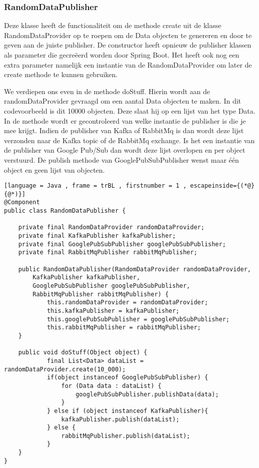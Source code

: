 \subsubsection{RandomDataPublisher}
Deze klasse heeft de functionaliteit om de methode create uit de klasse RandomDataProvider op te roepen om de Data objecten te genereren en door te geven aan de juiste publisher. De constructor heeft opnieuw de publisher klassen als parameter die gecreëerd worden door Spring Boot. Het heeft ook nog een extra parameter namelijk een instantie van de RandomDataProvider om later de create methode te kunnen gebruiken.

We verdiepen ons even in de methode doStuff. Hierin wordt aan de randomDataProvider gevraagd om een aantal Data objecten te maken. In dit codevoorbeeld is dit 10000 objecten. Deze slaat hij op een lijst van het type Data. In de methode wordt er gecontroleerd van welke instantie de publisher is die je mee krijgt. Indien de publisher van Kafka of RabbitMq is dan wordt deze lijst verzonden naar de Kafka topic of de RabbitMq exchange. Is het een instantie van de publisher van Google Pub/Sub dan wordt deze lijst overlopen en per object verstuurd. De publish methode van GooglePubSubPublisher wenst maar één object en geen lijst van objecten.

\begin{lstlisting}[language = Java , frame = trBL , firstnumber = 1 , escapeinside={(*@}{@*)}]
@Component
public class RandomDataPublisher {

    private final RandomDataProvider randomDataProvider;
    private final KafkaPublisher kafkaPublisher;
    private final GooglePubSubPublisher googlePubSubPublisher;
    private final RabbitMqPublisher rabbitMqPublisher;

    public RandomDataPublisher(RandomDataProvider randomDataProvider,
        KafkaPublisher kafkaPublisher,
        GooglePubSubPublisher googlePubSubPublisher,
        RabbitMqPublisher rabbitMqPublisher) {
            this.randomDataProvider = randomDataProvider;
            this.kafkaPublisher = kafkaPublisher;
            this.googlePubSubPublisher = googlePubSubPublisher;
            this.rabbitMqPublisher = rabbitMqPublisher;
    }

    public void doStuff(Object object) {
            final List<Data> dataList = randomDataProvider.create(10_000);
            if(object instanceof GooglePubSubPublisher) {
                for (Data data : dataList) {
                    googlePubSubPublisher.publishData(data);
                }
            } else if (object instanceof KafkaPublisher){
                kafkaPublisher.publish(dataList);
            } else {
                rabbitMqPublisher.publish(dataList);
            }
    }
}
\end{lstlisting}
